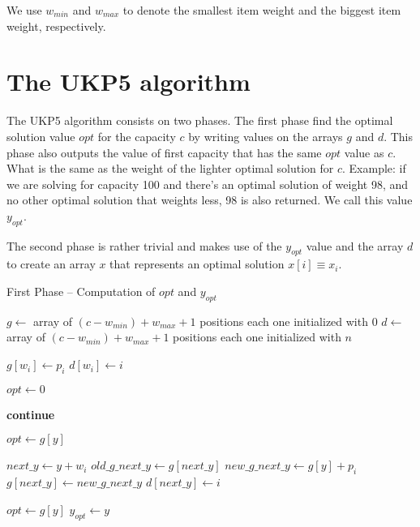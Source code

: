 \documentclass[12pt]{article}
\begin{document}
We use \(w_{min}\) and \(w_{max}\) to denote the smallest item weight and the biggest item weight, respectively.

\section{The UKP5 algorithm}

The UKP5 algorithm consists on two phases. The first phase find the optimal solution value \(opt\) for the capacity \(c\) by writing values on the arrays \(g\) and \(d\). This phase also outputs the value of first capacity that has the same \(opt\) value as \(c\). What is the same as the weight of the lighter optimal solution for \(c\). Example: if we are solving for capacity 100 and there's an optimal solution of weight 98, and no other optimal solution that weights less, 98 is also returned. We call this value \(y_{opt}\).

The second phase is rather trivial and makes use of the \(y_{opt}\) value and the array \(d\) to create an array \(x\) that represents an optimal solution \(x[i] \equiv x_i\).

\begin{algorithm}
\caption{First Phase -- Computation of $opt$ and $y_{opt}$}\label{alg:ukp6_write_phase}
\begin{algorithmic}[1]
  \State \(g \gets\) array of \((c - w_{min}) + w_{max} + 1\) positions each one initialized with \(0\)\label{create_g}
  \State \(d \gets\) array of \((c - w_{min}) + w_{max} + 1\) positions each one initialized with \(n\)\label{create_d}
  
  \label{begin_trivial_bounds}
      \State \(g[w_i] \gets p_i\)
      \State \(d[w_i] \gets i\)
    \EndIf
  \EndFor\label{end_trivial_bounds}

  \State \(opt \gets 0\)\label{init_opt}

  \label{main_ext_loop_begin}
    \label{if_less_than_opt_begin}
    	\State \textbf{continue}
    \EndIf\label{if_less_than_opt_end}
    
    \State \(opt \gets g[y]\)\label{update_opt}
    
    \label{main_inner_loop_begin}
      \State \(next\_y \gets y + w_i\)\label{calc_values_begin}
      \State \(old\_g\_next\_y \gets g[next\_y]\)
      \State \(new\_g\_next\_y \gets g[y] + p_i\)\label{calc_values_end}
      \label{if_new_lower_bound_begin}
        \State \(g[next\_y] \gets new\_g\_next\_y\)
        \State \(d[next\_y] \gets i\)
      \EndIf\label{if_new_lower_bound_end}
    \EndFor\label{main_inner_loop_end}
  \EndFor\label{main_ext_loop_end}

  \label{get_y_opt_loop_begin}
    \label{last_loop_inner_if}
      \State \(opt \gets g[y]\)
      \State \(y_{opt} \gets y\)
    \EndIf
  \EndFor\label{get_y_opt_loop_end}
\EndProcedure
\end{algorithmic}
\end{algorithm}
\end{document}
